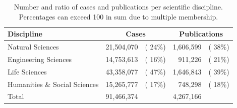 \begin{table}[t]
\caption{Number and ratio of cases and publications per scientific discipline. Percentages can exceed 100 in sum due to multiple membership.}
\label{tab:disciplines}
\centering
\begin{tabular}{lrrrr}
\toprule
  \textsf{\textbf{Discipline}}  & \multicolumn{2}{c}{\textsf{\textbf{Cases}}} & \multicolumn{2}{c}{\textsf{\textbf{Publications}}} \\
\midrule
  Natural Sciences              & 21,504,070 &          ({\color{gray} 24\%}) & 1,606,599 &                  ({\color{gray} 38\%}) \\
  Engineering Sciences          & 14,753,613 &          ({\color{gray} 16\%}) &   911,226 &                  ({\color{gray} 21\%}) \\
  Life Sciences                 & 43,358,077 &          ({\color{gray} 47\%}) & 1,646,843 &                  ({\color{gray} 39\%}) \\
  Humanities \& Social Sciences & 15,265,777 &          ({\color{gray} 17\%}) &   748,298 &                  ({\color{gray} 18\%}) \\
  Total                         & 91,466,374 &                                & 4,267,166 &                                        \\
\bottomrule
\end{tabular}
\end{table}